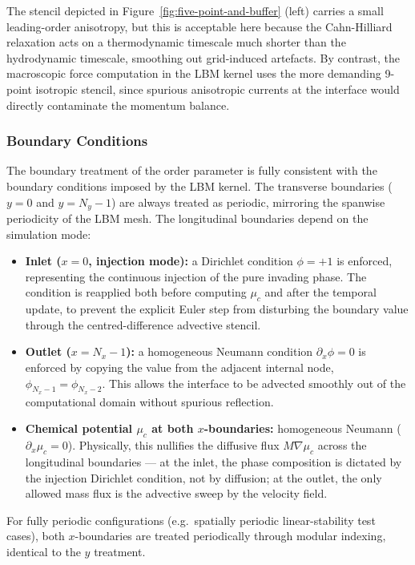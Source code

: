 The stencil depicted in Figure~\ref{fig:five-point-and-buffer} (left) carries a small leading-order anisotropy, but this is acceptable here because the Cahn-Hilliard relaxation acts on a thermodynamic timescale much shorter than the hydrodynamic timescale, smoothing out grid-induced artefacts.
By contrast, the macroscopic force computation in the LBM kernel uses the more demanding 9-point isotropic stencil, since spurious anisotropic currents at the interface would directly contaminate the momentum balance.

\subsubsection{Boundary Conditions}
The boundary treatment of the order parameter is fully consistent with the boundary conditions imposed by the LBM kernel.
The transverse boundaries ($y = 0$ and $y = N_y - 1$) are always treated as periodic, mirroring the spanwise periodicity of the LBM mesh.
The longitudinal boundaries depend on the simulation mode:
\begin{itemize}
    \item \textbf{Inlet ($x = 0$, injection mode):} a Dirichlet condition $\phi = +1$ is enforced, representing the continuous injection of the pure invading phase.
    The condition is reapplied both before computing $\mu_c$ and after the temporal update, to prevent the explicit Euler step from disturbing the boundary value through the centred-difference advective stencil.
    \item \textbf{Outlet ($x = N_x - 1$):} a homogeneous Neumann condition $\partial_x \phi = 0$ is enforced by copying the value from the adjacent internal node, $\phi_{N_x-1} = \phi_{N_x-2}$.
    This allows the interface to be advected smoothly out of the computational domain without spurious reflection.
    \item \textbf{Chemical potential $\mu_c$ at both $x$-boundaries:} homogeneous Neumann ($\partial_x \mu_c = 0$).
    Physically, this nullifies the diffusive flux $M \nabla \mu_c$ across the longitudinal boundaries --- at the inlet, the phase composition is dictated by the injection Dirichlet condition, not by diffusion;
    at the outlet, the only allowed mass flux is the advective sweep by the velocity field.
\end{itemize}
For fully periodic configurations (e.g.\ spatially periodic linear-stability test cases), both $x$-boundaries are treated periodically through modular indexing, identical to the $y$ treatment.

